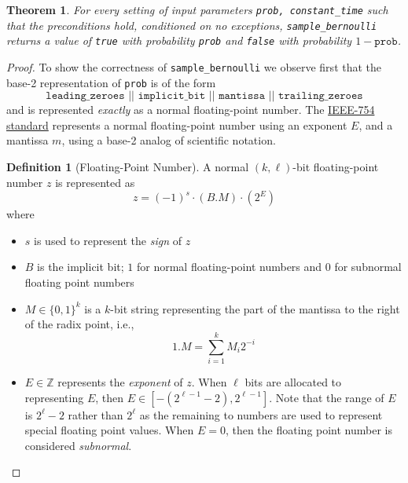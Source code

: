 \documentclass[11pt,a4paper]{article}
\newtheorem{theorem}{Theorem}[section]
\theoremstyle{definition}
\newtheorem{definition}{Definition}
\begin{document}
\begin{tcolorbox}
\begin{theorem} For every setting of input parameters \texttt{prob, constant\_time} such that the preconditions hold, conditioned on no exceptions, \texttt{sample\_bernoulli} returns a value of \texttt{true} with probability \texttt{prob} and \texttt{false} with probability $1 - \texttt{prob}$. 
\end{theorem}
\end{tcolorbox}

\begin{proof} 
To show the correctness of \texttt{sample\_bernoulli} we observe first that the base-2 representation of \texttt{prob} is of the form 
\[
\texttt{leading\_zeroes || implicit\_bit || mantissa || trailing\_zeroes}
\]
and is represented \emph{exactly} as a normal floating-point number. The \href{https://en.wikipedia.org/wiki/IEEE_754}{IEEE-754 standard} represents a normal floating-point number using an exponent $E$, and a mantissa $m$, using a base-2 analog of scientific notation. 

\begin{definition}[Floating-Point Number]
A normal $(k,\ell)$-bit floating-point number $z$ is represented as
\[
z = (-1)^s \cdot (B.M) \cdot (2^E) 
\]
where
\begin{itemize}
    \item $s$ is used to represent the \emph{sign} of $z$
    \item $B$ is the implicit bit; $1$ for normal floating-point numbers and $0$ for subnormal floating point numbers
    \item $M \in \{0,1\}^k$ is a $k$-bit string representing the part of the mantissa to the right of the radix point, i.e.,
    \[
    1.M = \sum_{i = 1}^k M_i2^{-i}
    \]
    \item $E \in \mathbb{Z}$ represents the \emph{exponent} of $z$. When $\ell$ bits are allocated to representing $E$, then $E \in [-(2^{\ell - 1} - 2), 2^{\ell - 1}]$. Note that the range of $E$ is $2^\ell - 2$ rather than $2^\ell$ as the remaining to numbers are used to represent special floating point values. When $E = 0$, then the floating point number is considered \emph{subnormal}. 
\end{itemize} 
\end{definition}


\end{proof}
\end{document}
